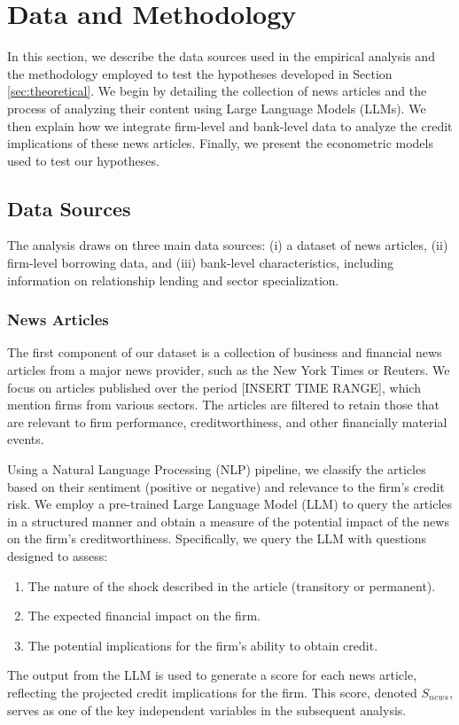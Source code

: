 \section{Data and Methodology}
\label{sec:data}

In this section, we describe the data sources used in the empirical analysis and the methodology employed to test the hypotheses developed in Section \ref{sec:theoretical}. We begin by detailing the collection of news articles and the process of analyzing their content using Large Language Models (LLMs). We then explain how we integrate firm-level and bank-level data to analyze the credit implications of these news articles. Finally, we present the econometric models used to test our hypotheses.

\subsection{Data Sources}

The analysis draws on three main data sources: (i) a dataset of news articles, (ii) firm-level borrowing data, and (iii) bank-level characteristics, including information on relationship lending and sector specialization.

\subsubsection{News Articles}

The first component of our dataset is a collection of business and financial news articles from a major news provider, such as the New York Times or Reuters. We focus on articles published over the period [INSERT TIME RANGE], which mention firms from various sectors. The articles are filtered to retain those that are relevant to firm performance, creditworthiness, and other financially material events. 

Using a Natural Language Processing (NLP) pipeline, we classify the articles based on their sentiment (positive or negative) and relevance to the firm's credit risk. We employ a pre-trained Large Language Model (LLM) to query the articles in a structured manner and obtain a measure of the potential impact of the news on the firm's creditworthiness. Specifically, we query the LLM with questions designed to assess:
\begin{enumerate}
    \item The nature of the shock described in the article (transitory or permanent).
    \item The expected financial impact on the firm.
    \item The potential implications for the firm's ability to obtain credit.
\end{enumerate}
The output from the LLM is used to generate a score for each news article, reflecting the projected credit implications for the firm. This score, denoted $S_{news}$, serves as one of the key independent variables in the subsequent analysis.

